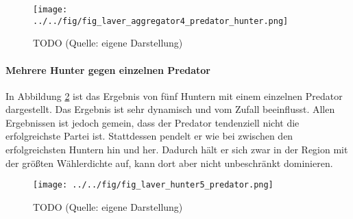 \begin{figure}[htb]
	\centering
	\texttt{[image: ../../fig/fig\_laver\_aggregator4\_predator\_hunter.png]}
	\caption{TODO (Quelle: eigene Darstellung)}
	\label{fig:laver-aggregator4-hunter-predator}
\end{figure}

\paragraph{Mehrere Hunter gegen einzelnen Predator}

In Abbildung \ref{fig:laver-hunter5-predator} ist das Ergebnis von fünf Huntern mit einem einzelnen Predator dargestellt. Das Ergebnis ist sehr dynamisch und vom Zufall beeinflusst. Allen Ergebnissen ist jedoch gemein, dass der Predator tendenziell nicht die erfolgreichste Partei ist. Stattdessen pendelt er wie bei \citet{laver2005policy} zwischen den erfolgreichsten Huntern hin und her. Dadurch hält er sich zwar in der Region mit der größten Wählerdichte auf, kann dort aber nicht unbeschränkt dominieren.

\begin{figure}[htb]
	\centering
	\texttt{[image: ../../fig/fig\_laver\_hunter5\_predator.png]}
	\caption{TODO (Quelle: eigene Darstellung)}
	\label{fig:laver-hunter5-predator}
\end{figure}

